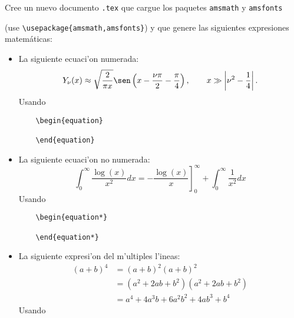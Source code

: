 \documentclass[11pt]{exam}
\begin{document}
\begin{questions}

\item Cree un nuevo documento \texttt{.tex} que cargue los paquetes \texttt{amsmath} y \texttt{amsfonts} 

(use \verb|\usepackage{amsmath,amsfonts}|) y que genere las siguientes expresiones matem\'aticas:
\begin{itemize}

\item La siguiente ecuaci'on numerada:
\begin{equation}\label{asinNnu}
Y_\nu(x)\approx \sqrt{\frac{2}{\pi x}}\sen\left(x-\frac{\nu\pi}{2}-\frac{\pi}{4}\right), 
\qquad x\gg\left|\nu^2-\frac{1}{4}\right|.
\end{equation}
Usando 

\begin{verbatim}
	\begin{equation}

	\end{equation}
\end{verbatim}
\item La siguiente ecuaci'on no numerada:
\begin{equation*}
\int_{0}^{\infty }\frac{\log (x)}{x^{2}}dx=-\left. \frac{\log (x)}{x}\right]
_{0}^{\infty }+\int_{0}^{\infty }\frac{1}{x^{2}}dx
\end{equation*}
Usando

\begin{verbatim}
	\begin{equation*}

	\end{equation*}
\end{verbatim}
\item La siguiente expresi'on del m'ultiples l'ineas:
\begin{align} 
(a+b)^4 &= (a+b)^2 (a+b)^2 \\
 &= (a^2+2ab+b^2) (a^2+2ab+b^2) \\
 &= a^4+4 a^3 b + 6 a^2 b^2 +4 a b^3 +b^4
\end{align}
Usando	

\begin{verbatim}


\end{verbatim}
\end{itemize}
\end{questions}
\end{document}

